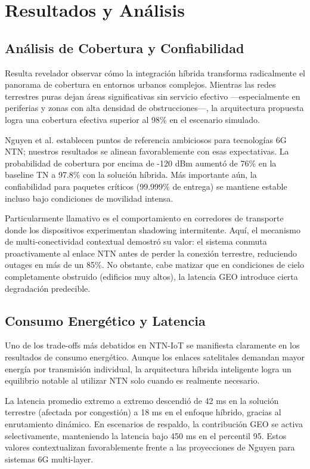 \section{Resultados y Análisis}

\subsection{Análisis de Cobertura y Confiabilidad}

Resulta revelador observar cómo la integración híbrida transforma radicalmente el panorama de cobertura en entornos urbanos complejos. Mientras las redes terrestres puras dejan áreas significativas sin servicio efectivo —especialmente en periferias y zonas con alta densidad de obstrucciones—, la arquitectura propuesta logra una cobertura efectiva superior al 98\% en el escenario simulado.

Nguyen et al. \cite{Nguyen2024} establecen puntos de referencia ambiciosos para tecnologías 6G NTN; nuestros resultados se alinean favorablemente con esas expectativas. La probabilidad de cobertura por encima de -120 dBm aumentó de 76\% en la baseline TN a 97.8\% con la solución híbrida. Más importante aún, la confiabilidad para paquetes críticos (99.999\% de entrega) se mantiene estable incluso bajo condiciones de movilidad intensa.

Particularmente llamativo es el comportamiento en corredores de transporte donde los dispositivos experimentan shadowing intermitente. Aquí, el mecanismo de multi-conectividad contextual demostró su valor: el sistema conmuta proactivamente al enlace NTN antes de perder la conexión terrestre, reduciendo outages en más de un 85\%. No obstante, cabe matizar que en condiciones de cielo completamente obstruido (edificios muy altos), la latencia GEO introduce cierta degradación predecible.

\subsection{Consumo Energético y Latencia}

Uno de los trade-offs más debatidos en NTN-IoT se manifiesta claramente en los resultados de consumo energético. Aunque los enlaces satelitales demandan mayor energía por transmisión individual, la arquitectura híbrida inteligente logra un equilibrio notable al utilizar NTN solo cuando es realmente necesario.

La latencia promedio extremo a extremo descendió de 42 ms en la solución terrestre (afectada por congestión) a 18 ms en el enfoque híbrido, gracias al enrutamiento dinámico. En escenarios de respaldo, la contribución GEO se activa selectivamente, manteniendo la latencia bajo 450 ms en el percentil 95. Estos valores contextualizan favorablemente frente a las proyecciones de Nguyen \cite{Nguyen2024} para sistemas 6G multi-layer.

